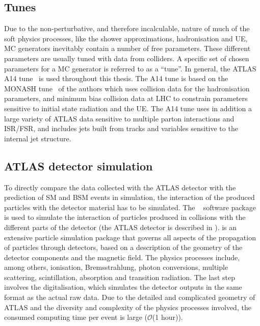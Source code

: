 \subsection{Tunes}

Due to the non-perturbative, and therefore incalculable, nature of much of the soft physics processes, like the shower approximations, hadronisation and \ac{UE}, \ac{MC} generators inevitably contain a number of free parameters. These different parameters are usually tuned with data from colliders. A specific set of chosen parameters for a \ac{MC} generator is referred to as a “tune”.
In general, the \ac{ATLAS} \Pythia A14 tune~\cite{Pythia-A14Tune} is used throughout this thesis.
The A14 tune is based on the MONASH tune~\cite{MonashTune} of the \Pythia authors which uses \ee collision data for the hadronisation parameters, and minimum bias \pp collision data at \ac{LHC} to constrain parameters sensitive to initial state radiation and the \ac{UE}. The A14 tune uses in addition a large variety of \ac{ATLAS} data sensitive to multiple parton interactions and \ac{ISR}/\ac{FSR}, and includes jets built from tracks and variables sensitive to the internal jet structure.


\subsection{\acs{ATLAS} detector simulation}

To directly compare the data collected with the \ac{ATLAS} detector with the prediction of \ac{SM} and \ac{BSM} events in simulation, the interaction of the produced particles with the detector material has to be simulated.
The \GEANT~\cite{Geant4} software package is used to simulate the interaction of particles produced in \pp collisions with the different parts of the detector (the \ac{ATLAS} detector is described in \Ch{\ref{ch:atlas}}). \GEANT is an extensive particle simulation package that governs all aspects of the propagation of particles through detectors, based on a description of the geometry of the detector components and the magnetic field. The physics processes include, among others, ionisation, Bremsstrahlung, photon conversions, multiple scattering, scintillation, absorption and transition radiation. The last step involves the digitalisation, which simulates the detector outputs in the same format as the actual raw data. Due to the detailed and complicated geometry of \ac{ATLAS} and the diversity and complexity of the physics processes involved, the consumed computing time per event is large (\(\mathcal{O}\)(1 hour)).

